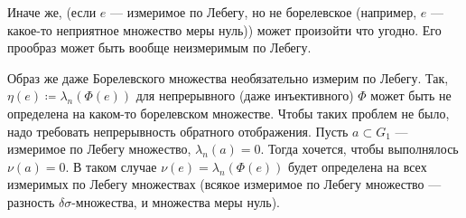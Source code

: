 \documentclass[a4paper]{report}
\begin{document}
    Иначе же, (если $e$ --- измеримое по Лебегу, но не борелевское (например, $e$ --- какое-то неприятное множество меры нуль)) может произойти что угодно.
    Его прообраз может быть вообще неизмеримым по Лебегу.

    Образ же даже Борелевского множества необязательно измерим по Лебегу.
    Так, $\eta(e) \coloneqq \lambda_n(\Phi(e))$ для непрерывного (даже инъективного) $\Phi$ может быть не определена на каком-то борелевском множестве.
    Чтобы таких проблем не было, надо требовать непрерывность обратного отображения.
    Пусть $a \subset G_1$ --- измеримое по Лебегу множество, $\lambda_n(a) = 0$.
    Тогда хочется, чтобы выполнялось $\nu(a) = 0$.
    В таком случае $\nu(e) = \lambda_n(\Phi(e))$ будет определена на всех измеримых по Лебегу множествах (всякое измеримое по Лебегу множество --- разность $\delta\sigma$-множества, и множества меры нуль).
\end{document}
